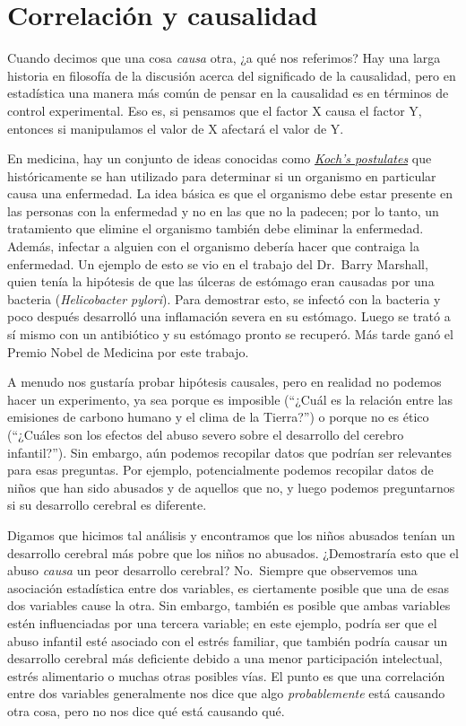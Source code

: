 \documentclass[
  12pt,
]{book}
\begin{document}
\hypertarget{correlaciuxf3n-y-causalidad}{%
\section{Correlación y causalidad}\label{correlaciuxf3n-y-causalidad}}

Cuando decimos que una cosa \emph{causa} otra, ¿a qué nos referimos? Hay una larga historia en filosofía de la discusión acerca del significado de la causalidad, pero en estadística una manera más común de pensar en la causalidad es en términos de control experimental. Eso es, si pensamos que el factor X causa el factor Y, entonces si manipulamos el valor de X afectará el valor de Y.

En medicina, hay un conjunto de ideas conocidas como \href{https://en.wikipedia.org/wiki/Koch\%27s_postulates}{\emph{Koch's postulates}} que históricamente se han utilizado para determinar si un organismo en particular causa una enfermedad. La idea básica es que el organismo debe estar presente en las personas con la enfermedad y no en las que no la padecen; por lo tanto, un tratamiento que elimine el organismo también debe eliminar la enfermedad. Además, infectar a alguien con el organismo debería hacer que contraiga la enfermedad. Un ejemplo de esto se vio en el trabajo del Dr.~Barry Marshall, quien tenía la hipótesis de que las úlceras de estómago eran causadas por una bacteria (\emph{Helicobacter pylori}). Para demostrar esto, se infectó con la bacteria y poco después desarrolló una inflamación severa en su estómago. Luego se trató a sí mismo con un antibiótico y su estómago pronto se recuperó. Más tarde ganó el Premio Nobel de Medicina por este trabajo.

A menudo nos gustaría probar hipótesis causales, pero en realidad no podemos hacer un experimento, ya sea porque es imposible (``¿Cuál es la relación entre las emisiones de carbono humano y el clima de la Tierra?'') o porque no es ético (``¿Cuáles son los efectos del abuso severo sobre el desarrollo del cerebro infantil?''). Sin embargo, aún podemos recopilar datos que podrían ser relevantes para esas preguntas. Por ejemplo, potencialmente podemos recopilar datos de niños que han sido abusados y de aquellos que no, y luego podemos preguntarnos si su desarrollo cerebral es diferente.

Digamos que hicimos tal análisis y encontramos que los niños abusados tenían un desarrollo cerebral más pobre que los niños no abusados. ¿Demostraría esto que el abuso \emph{causa} un peor desarrollo cerebral? No.~Siempre que observemos una asociación estadística entre dos variables, es ciertamente posible que una de esas dos variables cause la otra. Sin embargo, también es posible que ambas variables estén influenciadas por una tercera variable; en este ejemplo, podría ser que el abuso infantil esté asociado con el estrés familiar, que también podría causar un desarrollo cerebral más deficiente debido a una menor participación intelectual, estrés alimentario o muchas otras posibles vías. El punto es que una correlación entre dos variables generalmente nos dice que algo \emph{probablemente} está causando otra cosa, pero no nos dice qué está causando qué.
\end{document}
